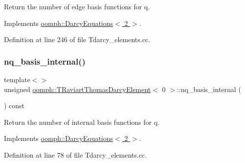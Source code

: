 Return the number of edge basis functions for q. 



Implements \hyperlink{classoomph_1_1DarcyEquations_a13cbb6dce25734c0d3844466b0435d17}{oomph\+::\+Darcy\+Equations$<$ 2 $>$}.



Definition at line 246 of file Tdarcy\+\_\+elements.\+cc.

\mbox{\label{classoomph_1_1TRaviartThomasDarcyElement_a27b5298596626c740e198efbd90ad8f0}} 
\subsubsection{\texorpdfstring{nq\+\_\+basis\+\_\+internal()}{nq\_basis\_internal()}\hspace{0.1cm}{\footnotesize\ttfamily [1/3]}}
{\footnotesize\ttfamily template$<$$>$ \\
unsigned \hyperlink{classoomph_1_1TRaviartThomasDarcyElement}{oomph\+::\+T\+Raviart\+Thomas\+Darcy\+Element}$<$ 0 $>$\+::nq\+\_\+basis\+\_\+internal (\begin{DoxyParamCaption}{ }\end{DoxyParamCaption}) const\hspace{0.3cm}{\ttfamily [virtual]}}



Return the number of internal basis functions for q. 



Implements \hyperlink{classoomph_1_1DarcyEquations_ad1836d0919835cd1d5f6af654ca03a52}{oomph\+::\+Darcy\+Equations$<$ 2 $>$}.



Definition at line 78 of file Tdarcy\+\_\+elements.\+cc.

\mbox{\label{classoomph_1_1TRaviartThomasDarcyElement_aeff07bf55d4794ab817827c367ec49f8}} 
